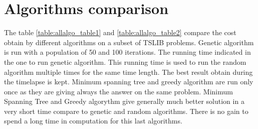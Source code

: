 \documentclass[11pt, english]{article}
\begin{document}
\section{Algorithms comparison}

The table \ref{table:allalgo_table1} and \ref{table:allalgo_table2} compare the cost obtain by different algorithms on a subset of TSLIB problems. Genetic algorithm is run  with a population of 50 and 100 iterations. The running time indicated in the one to run genetic algorithm. This running time is used to run the random algorithm multiple times for the same time length. The best result obtain during the timelapse is kept.
Minimum spanning tree and greedy algorithm are run only once as they are giving always the answer on the same problem.
Minimum Spanning Tree and Greedy algorythm give generally much better solution in a very short time compare to genetic and random algorithms. There is no gain to spend a long time in computation for this last algorithms. 
\end{document}
